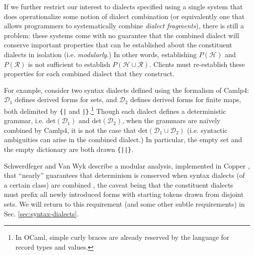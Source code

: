 If we further restrict our interest  to dialects specified using a single system that does operationalize some notion of dialect combination (or equivalently one that allows programmers to systematically combine \emph{dialect fragments}), there is still a problem: these systems come with no guarantee that the combined dialect will conserve important properties that can be established about the constituent dialects in isolation (i.e. \emph{modularly}.) In other words, establishing $P(\mathcal{H})$ and $P(\mathcal{R})$ is not sufficient to establish $P(\mathcal{H} \cup \mathcal{R})$. Clients must re-establish these properties for each combined dialect that they construct.%

For example, consider two syntax dialects defined using the formalism of Camlp4: $\mathcal{D}_1$ defines derived forms for sets, and $\mathcal{D}_2$ defines derived forms for finite maps, both delimited by \verb~{|~ and \verb~|}~.\footnote{In OCaml, simple curly braces are already reserved by the language for record types and values.} Though each dialect defines a deterministic grammar, i.e. $\mathrm{det}(\mathcal{D}_1)$ and $\mathrm{det}(\mathcal{D}_2)$, when the grammars are na\"ively combined by Camlp4, it is not the case that $\mathrm{det}(\mathcal{D}_1 \cup \mathcal{D}_2)$ (i.e. syntactic ambiguities can arise in the combined dialect.) In particular, the empty set and the empty dictionary are both drawn \verb~{||}~. %

Schwerdfeger and Van Wyk describe a modular analysis, implemented in Copper \cite{conf/gpce/WykS07}, that ``nearly'' guarantees that determinism is conserved when syntax dialects (of a certain class) are combined \cite{conf/pldi/SchwerdfegerW09}, the caveat being that the constituent dialects must prefix all newly introduced forms with starting tokens drawn from disjoint sets. We will return to this requirement (and some other subtle requirements) in Sec. \ref{sec:syntax-dialects}.



